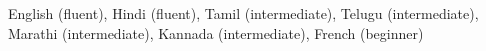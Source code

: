 English (fluent), Hindi (fluent), Tamil (intermediate), Telugu (intermediate), Marathi (intermediate), Kannada (intermediate), French (beginner)